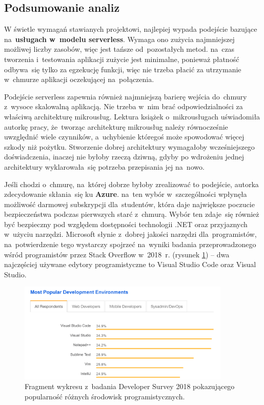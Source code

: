 \documentclass[12pt,a4paper,twoside,titlepage,openright]{book}
\begin{document}
\subsection{Podsumowanie analiz}

W świetle wymagań stawianych projektowi, najlepiej wypada podejście bazujące na~\textbf{usługach w~modelu serverless}. Wymaga ono zużycia najmniejszej możliwej liczby zasobów, więc jest tańsze od~pozostałych metod. na~czas tworzenia i~testowania aplikacji zużycie jest minimalne, ponieważ płatność odbywa~się tylko za egzekucję funkcji, więc nie trzeba płacić za utrzymanie w~chmurze aplikacji oczekującej na~połączenia. 

Podejście serverless zapewnia również najmniejszą barierę wejścia do~chmury z~wysoce skalowalną aplikacją. Nie trzeba w~nim brać odpowiedzialności za właściwą architekturę mikrousług. Lektura książek\cite{microservicesPacktNetCore, microservicesSusan, microservicesWmii} o~mikrousługach uświadomiła autorkę pracy, że~tworząc architekturę mikrousług należy równocześnie uwzględnić wiele czynników, a~uchybienie któregoś może spowodować więcej szkody niż pożytku. Stworzenie dobrej architektury wymagałoby wcześniejszego doświadczenia, inaczej nie byłoby rzeczą dziwną, gdyby po wdrożeniu jednej architektury wyklarowała~się potrzeba przepisania jej na~nowo.

Jeśli chodzi o~chmurę, na~której dobrze byłoby zrealizować to podejście, autorka zdecydowanie skłania~się ku \textbf{Azure}. na~ten wybór w~szczególności wpłynęła możliwość darmowej subskrypcji dla~studentów, która daje największe poczucie bezpieczeństwa podczas pierwszych starć z~chmurą. Wybór ten zdaje~się również być bezpieczny pod względem dostępności technologii .NET oraz przyjaznych w~użyciu narzędzi. Microsoft słynie z~dobrej jakości narzędzi dla~programistów, na~potwierdzenie tego wystarczy spojrzeć na~wyniki badania przeprowadzonego wśród programistów przez Stack Overflow w~2018~r. (rysunek \ref{fig:stackOverflowSurvey}) -- dwa najczęściej używane edytory programistyczne to Visual Studio Code oraz Visual Studio. 

\begin{figure}[h]
	\centering
			\includegraphics[width=0.9\textwidth]{stackOverflowSurvey.png}
		\caption{Fragment wykresu z~badania Developer Survey 2018 pokazującego popularność różnych środowisk programistycznych. \cite{siteStackOverflowSurvey}}
		\label{fig:stackOverflowSurvey}
\end{figure} 
\end{document}
